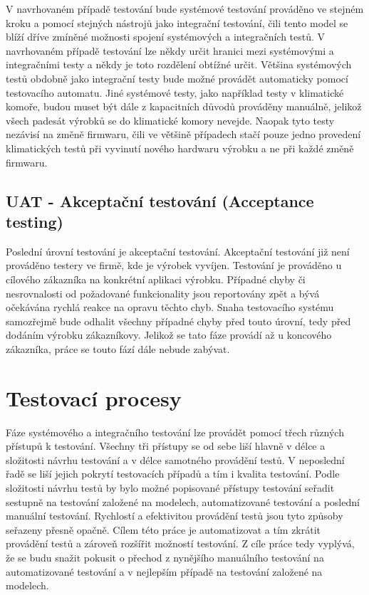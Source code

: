 V navrhovaném případě testování bude systémové testování prováděno ve stejném kroku a pomocí stejných nástrojů jako integrační testování, čili tento model se blíží dříve zmíněné možnosti spojení systémových a integračních testů. V navrhovaném případě testování lze někdy určit hranici mezi systémovými a integračními testy a někdy je toto rozdělení obtížné určit. Většina systémových testů obdobně jako integrační testy bude možné provádět automaticky pomocí testovacího automatu. Jiné systémové testy, jako například testy v klimatické komoře, budou muset být dále z kapacitních důvodů prováděny manuálně, jelikož všech padesát výrobků se do klimatické komory nevejde. Naopak tyto testy nezávisí na změně firmwaru, čili ve většině případech stačí pouze jedno provedení klimatických testů při vyvinutí nového hardwaru výrobku a ne při každé změně firmwaru.

\subsection{UAT - Akceptační testování (Acceptance testing)}
Poslední úrovní testování je akceptační testování. Akceptační testování již není prováděno testery ve firmě, kde je výrobek vyvíjen. Testování je prováděno u cílového zákazníka na konkrétní aplikaci výrobku. Případné chyby či nesrovnalosti od požadované funkcionality jsou reportovány zpět a bývá očekávána rychlá reakce na opravu těchto chyb. Snaha testovacího systému samozřejmě bude odhalit všechny případné chyby před touto úrovní, tedy před dodáním výrobku zákazníkovy. Jelikož se tato fáze provádí až u koncového zákazníka, práce se touto fází dále nebude zabývat.

\section{Testovací procesy}
Fáze systémového a integračního testování lze provádět pomocí třech různých přístupů k testování. Všechny tři přístupy se od sebe liší hlavně v délce a složitosti návrhu testování a v délce samotného provádění testů. V neposlední řadě se liší jejich pokrytí testovacích případů a tím i kvalita testování. Podle složitosti návrhu testů by bylo možné popisované přístupy testování seřadit sestupně na testování založené na modelech, automatizované testování a poslední manuální testování. Rychlostí a efektivitou provádění testů jsou tyto způsoby seřazeny přesně opačně. Cílem této práce je automatizovat a tím zkrátit provádění testů a zároveň rozšířit možností testování. Z cíle práce tedy vyplývá, že se budu snažit pokusit o přechod z nynějšího manuálního testování na automatizované testování a v nejlepším případě na testování založené na modelech.

